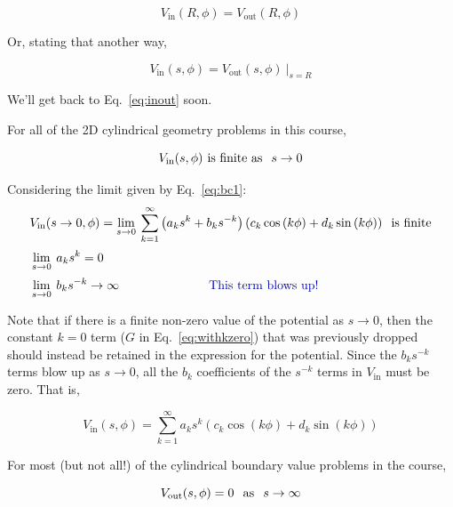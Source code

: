\documentclass[12pt]{article}
\begin{document}
\begin{flushleft}
\begin{equation}
V_{\text{in}}(R,\phi) = V_{\text{out}}(R,\phi)
\label{eq:inout}
\end{equation}

Or, stating that another way,

\[
\left. V_{\text{in}}(s,\phi) = V_{\text{out}}(s,\phi) \: \right|_{s=R}
\]

We'll get back to Eq.~\ref{eq:inout} soon.

For all of the 2D cylindrical geometry problems in this course, 

\begin{equation}
V_{\text{in}}(s,\phi)   \hspace{.05in} \text{is finite as} \hspace{.1in} s\rightarrow 0 
\label{eq:bc1}
\end{equation}

Considering the limit given by Eq.~\ref{eq:bc1}:
\begin{align}
& V_{\text{in}}(s\rightarrow 0, \phi)=\lim\limits_{s \to 0} \: \sum_{k=1}^{\infty}  \left(  a_{k}s^{k} + b_{k}s^{-k} \right) ( c_{k} \cos{(k\phi)}+d_{k}\sin{(k\phi)} ) \hspace{.1in} \text{is finite} \notag \\[2pt]
& \lim\limits_{s \to 0} \: a_{k}s^{k} = 0 \notag \\[2pt]
& \lim\limits_{s \to 0} \: b_{k}s^{-k} \rightarrow \infty \hspace{1in} \text{\color{myblue} This term blows up!} \notag 
\end{align}

Note that if there is a finite non-zero value of the potential as $s\rightarrow 0$, then the constant $k=0$ term ($G$ in Eq.~\ref{eq:withkzero}) that was previously dropped should instead be retained in the expression for the potential.  Since the $b_{k}s^{-k}$ terms blow up as $s\rightarrow 0$, all the $b_{k}$ coefficients of the $s^{-k}$ terms in $V_{\text{in}}$ must be zero.  That is,

\begin{equation}
 V_{\text{in}}(s,\phi) = \sum_{k=1}^{\infty} a_{k}s^{k} ( c_{k}\cos{(k\phi)}+d_{k}\sin{(k\phi)} ) 
\label{eq:vin}
\end{equation}

For most (but not all!) of the cylindrical boundary value problems in the course, 

\begin{equation}
V_{\text{out}}(s,\phi) = 0 \hspace{.1in} \text{as} \hspace{.1in} s\rightarrow \infty 
\label{eq:bc2}
\end{equation}


\end{flushleft}
\end{document}
